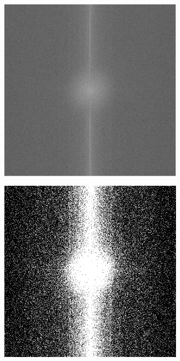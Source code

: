 \documentclass{article}
\begin{document}
\begin{figure}[H]
	\begin{subfigure}[b]{0.32\textwidth}
		\includegraphics[width=\linewidth]{step1_dp}
		\caption{}
		\label{fig:step1lpf}
	\end{subfigure}%
	\hspace{\fill}
	\begin{subfigure}[b]{0.32\textwidth}
		\includegraphics[width=\linewidth]{step2}

\end{subfigure}
\end{figure}
\end{document}
